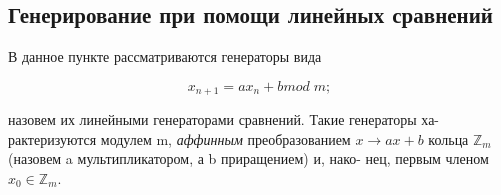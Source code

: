 \subsection{Генерирование при помощи линейных сравнений}

\noindent В данное пункте рассматриваются генераторы вида \par 
$$x_{n+1} = ax_{n} + b mod \; m;$$ \par
\noindent назовем их линейными генераторами сравнений. Такие генераторы ха- \linebreak рактеризуются модулем m, \textit{аффинным} преобразованием $x \to ax + b$ кольца $\mathbb{Z}_{m}$ (назовем a мультипликатором, а b приращением) и, нако- \linebreak нец, первым членом $x_{0} \in \mathbb{Z}_{m}$. \par \newpage 



